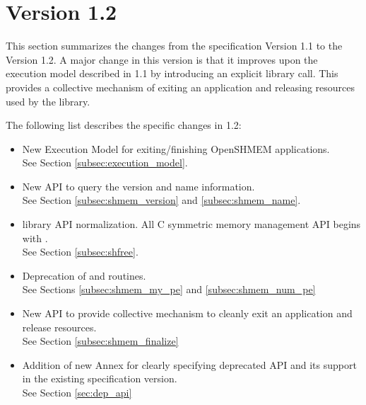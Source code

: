 \section{Version 1.2}
This section summarizes the changes from the \openshmem specification Version 1.1 to the Version 1.2.  
A major change in this version is that it improves upon the execution model described in 1.1 by introducing an explicit  library call. This provides a collective mechanism of exiting an \openshmem application and releasing resources used by the library.  



The following list describes the specific changes in 1.2:
\begin{itemize}
\item New Execution Model for exiting/finishing OpenSHMEM applications.
\\See Section  \ref{subsec:execution_model}.
\item New API to query the version and name information. 
\\See Section \ref{subsec:shmem_version} and \ref{subsec:shmem_name}.
\item \openshmem library API normalization. All C symmetric memory management API begins with  .
\\See Section \ref{subsec:shfree}.
\item Deprecation of  and  routines.
\\See Sections \ref{subsec:shmem_my_pe} and \ref{subsec:shmem_num_pe}
\item New API  to provide collective mechanism to cleanly exit an \openshmem application and release resources.
\\See Section \ref{subsec:shmem_finalize}
\item Addition of new Annex for clearly specifying deprecated API and its support in the existing specification version.
\\See Section \ref{sec:dep_api}

\end{itemize}
